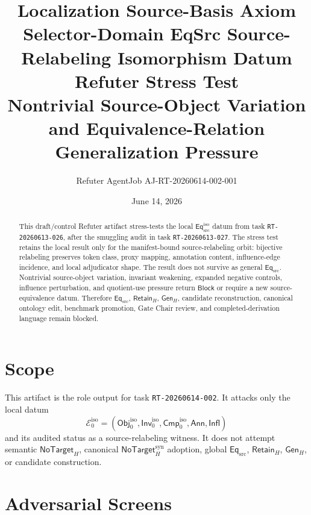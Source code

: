 \documentclass[11pt]{article}
\title{\textbf{Localization Source-Basis Axiom Selector-Domain EqSrc Source-Relabeling Isomorphism Datum Refuter Stress Test}\\[0.35em]
\large Nontrivial Source-Object Variation and Equivalence-Relation Generalization Pressure}
\author{Refuter AgentJob AJ-RT-20260614-002-001}
\date{June 14, 2026}
\newcommand{\Obj}{\mathsf{Obj}_{0}^{\mathrm{iso}}}
\newcommand{\Inv}{\mathsf{Inv}_{0}^{\mathrm{iso}}}
\newcommand{\Cmp}{\mathsf{Cmp}_{0}^{\mathrm{iso}}}
\newcommand{\EqSrc}{\mathsf{Eq}_{\mathrm{src}}}
\newcommand{\EqIso}{\mathsf{Eq}_{\mathrm{src}}^{\mathrm{iso}}}
\newcommand{\GenH}{\mathsf{Gen}_{H}}
\newcommand{\RetainH}{\mathsf{Retain}_{H}}
\newcommand{\NoTargetH}{\mathsf{NoTarget}_{H}}
\newcommand{\NoTargetSyn}{\mathsf{NoTarget}_{H}^{\mathrm{syn}}}
\newcommand{\Annot}{\mathsf{Ann}}
\newcommand{\Influence}{\mathsf{Infl}}
\newcommand{\Block}{\mathsf{Block}}
\begin{document}
\maketitle

\begin{abstract}
This draft/control Refuter artifact stress-tests the local
\(\EqIso\) datum from task \texttt{RT-20260613-026}, after the
smuggling audit in task \texttt{RT-20260613-027}. The stress test retains
the local result only for the manifest-bound source-relabeling orbit:
bijective relabeling preserves token class, proxy mapping, annotation
content, influence-edge incidence, and local adjudicator shape. The result
does not survive as general \(\EqSrc\). Nontrivial source-object
variation, invariant weakening, expanded negative controls, influence
perturbation, and quotient-use pressure return \(\Block\) or require a new
source-equivalence datum. Therefore \(\EqSrc\), \(\RetainH\), \(\GenH\),
candidate reconstruction, canonical ontology edit, benchmark promotion,
Gate Chair review, and completed-derivation language remain blocked.
\end{abstract}

\section{Scope}

This artifact is the role output for task \texttt{RT-20260614-002}. It
attacks only the local datum
\[
    \mathcal{E}_{0}^{\mathrm{iso}} =
    (\Obj,\Inv,\Cmp,\Annot,\Influence)
\]
and its audited status as a source-relabeling witness. It does not attempt
semantic \(\NoTargetH\), canonical \(\NoTargetSyn\) adoption, global
\(\EqSrc\), \(\RetainH\), \(\GenH\), or candidate construction.

\section{Adversarial Screens}
\end{document}
